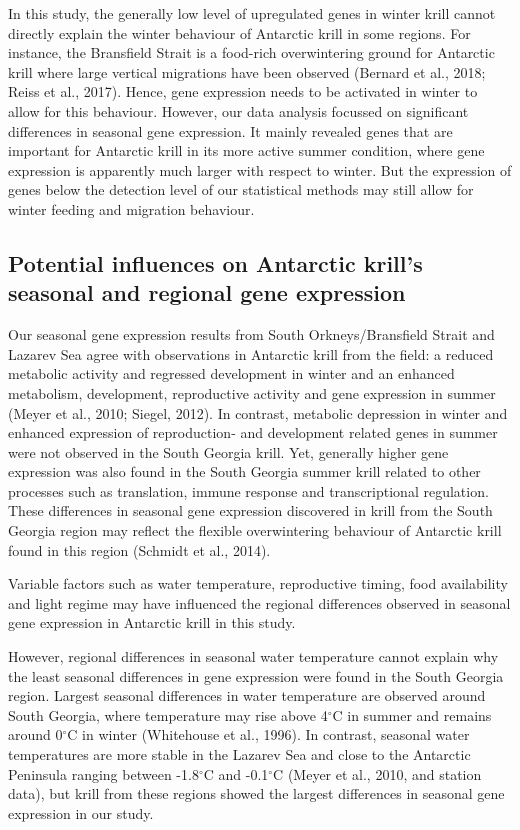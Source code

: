 In this study, the generally low level of upregulated genes in winter krill
cannot directly explain the winter behaviour of Antarctic krill in some
regions. For instance, the Bransfield Strait is a food-rich overwintering
ground for Antarctic krill where large vertical migrations have been observed
(Bernard et al., 2018; Reiss et al., 2017). Hence, gene expression needs to be
activated in winter to allow for this behaviour. However, our data analysis
focussed on significant differences in seasonal gene expression. It mainly
revealed genes that are important for Antarctic krill in its more active summer
condition, where gene expression is apparently much larger with respect to
winter. But the expression of genes below the detection level of our
statistical methods may still allow for winter feeding and migration behaviour.

\subsection*{Potential influences on Antarctic krill's seasonal and regional gene expression}

Our seasonal  gene expression results from South Orkneys/Bransfield Strait and
Lazarev Sea agree with observations in Antarctic krill from the field: a
reduced metabolic activity and regressed development in winter and an enhanced
metabolism, development, reproductive activity and gene expression in summer
(Meyer et al., 2010; Siegel, 2012). In contrast, metabolic depression in winter
and enhanced expression of reproduction- and development related genes in
summer were not observed in the South Georgia krill.  Yet, generally higher
gene expression was also found in the South Georgia summer krill related to
other processes such as translation, immune response and transcriptional
regulation. These differences in seasonal gene expression discovered in krill
from the South Georgia region may reflect the flexible overwintering behaviour
of Antarctic krill found in this region (Schmidt et al., 2014).

Variable factors such as water temperature, reproductive timing, food
availability and light regime may have influenced the regional differences
observed in seasonal gene expression in Antarctic krill in this study.

However, regional differences in seasonal water temperature cannot explain why
the least seasonal differences in gene expression were found in the South
Georgia region. Largest seasonal differences in water temperature are observed
around South Georgia, where temperature may rise above 4$^{\circ}$C in summer
and remains around 0$^{\circ}$C in winter (Whitehouse et al., 1996). In
contrast, seasonal water temperatures are more stable in the Lazarev Sea and
close to the Antarctic Peninsula ranging between -1.8$^{\circ}$C  and
-0.1$^{\circ}$C (Meyer et al., 2010, and station data), but krill from these
regions showed the largest differences in seasonal gene expression in our
study.

